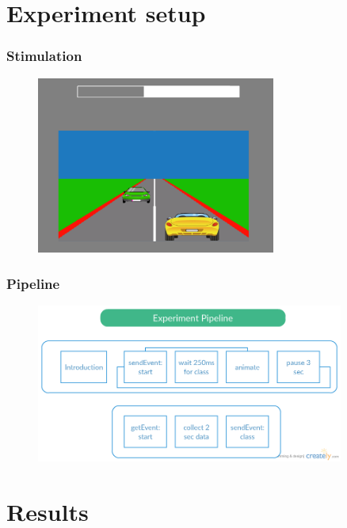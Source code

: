 \documentclass{beamer}
\begin{document}
\section{Experiment setup}
\begin{frame}
  \frametitle{Stimulation}

  \begin{figure}
    \includegraphics[width=0.7\textwidth]{brain_racer.png}
  \end{figure}

\end{frame}



\begin{frame}
  \frametitle{Pipeline}

  \begin{figure}
    \centering
    \includegraphics[width=0.9\textwidth]{brain_racer_pipeline.png}
  \end{figure}
\end{frame}

\section{Results}
\end{document}
